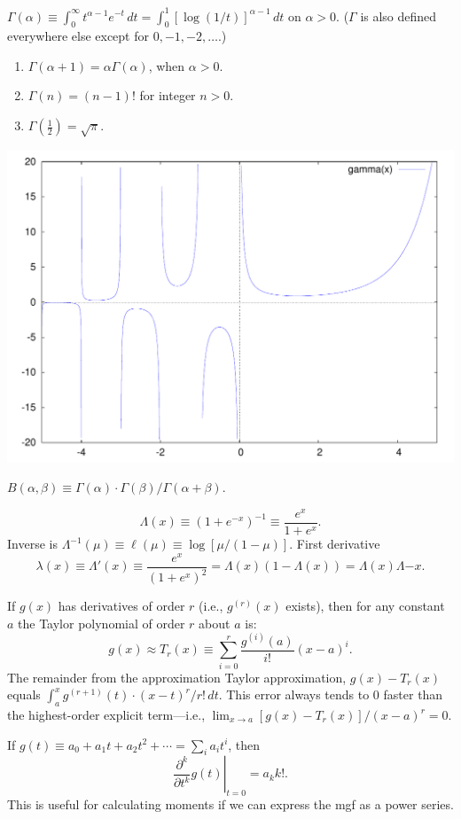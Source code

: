 \documentclass[8pt,letterpaper, landscape]{extarticle} %
\renewcommand{\ln}{\log}
\begin{document}
\begin{multicols}{3}
\begin{description}
 $ \Gamma (\alpha) \equiv \int_0^\infty t^{\alpha - 1} e^{-t} \, dt = \int_0^1 [\ln(1/t)]^{\alpha -1} \, dt $ on $ \alpha > 0 $. ($ \Gamma $ is also defined everywhere else except for $ 0, -1, -2, \dotsc $.)
\begin{enumerate}
\item $ \Gamma ( \alpha + 1) = \alpha \Gamma (\alpha) $, when $ \alpha > 0 $.
\item $ \Gamma (n) = (n-1)! $ for integer $ n >0 $.
\item $ \Gamma (\tfrac{1}{2}) = \sqrt{\pi} $.
\end{enumerate}
\begin{center} \includegraphics[width=.5\linewidth]{images/gamma} \end{center}

 $ B (\alpha, \beta) \equiv \Gamma (\alpha) \cdot \Gamma (\beta) / \Gamma (\alpha + \beta) $.

\[ \Lambda (x) \equiv (1 + e^{-x})^{-1} \equiv \frac{e^x}{1 + e^x}. \]
Inverse is $ \Lambda^{-1}(\mu) \equiv \ell(\mu) \equiv \ln [\mu / (1 - \mu)] $. First derivative
$$ \lambda(x) \equiv \Lambda'(x) \equiv \frac{e^x}{(1 + e^x)^2} = \Lambda(x) (1- \Lambda (x)) = \Lambda(x) \Lambda{-x} . $$

 If $ g(x) $ has derivatives of order $ r $ (i.e., $ g^{(r)}(x) $ exists), then for any constant $ a $ the Taylor polynomial of order $ r $ about $ a $ is:
$$ g(x) \approx T_r (x) \equiv \sum_{i=0}^r \frac{g^{(i)}(a)}{i!}(x-a)^{i}. $$
The remainder from the approximation Taylor approximation, $ g(x) - T_r (x) $ equals $ \int_a^x g^{(r+1)}(t) \cdot (x-t)^r / r! \, dt $.
This error always tends to $ 0 $ faster than the highest-order explicit term---i.e., $ \lim_{x \to a} [g(x) - T_r(x)]/(x-a)^r = 0 $.

 If $ g(t) \equiv  a_0 + a_1 t + a_2 t^2 + \dotsb = \sum_i a_i t^i $, then
$$ \left. \frac{\partial^k}{\partial t^k} g(t) \right|_{t=0} = a_k k!. $$
This is useful for calculating moments if we can express the mgf as a power series.


\end{description}
\end{multicols}
\end{document}
